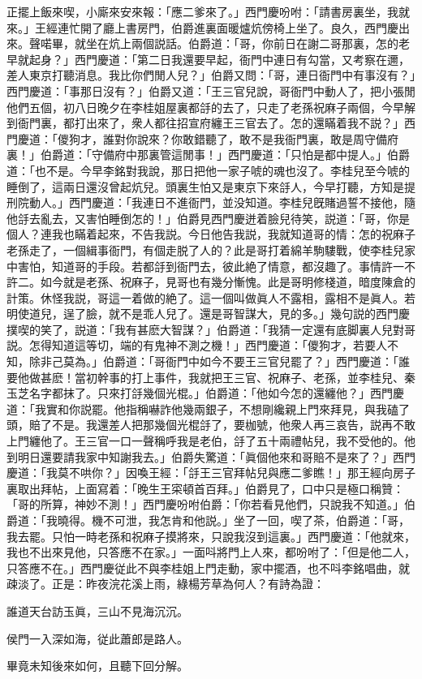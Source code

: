 正擺上飯來喫，小廝來安來報：「應二爹來了。」西門慶吩咐：「請書房裏坐，我就來。」王經連忙開了廳上書房門，伯爵進裏面暖爐炕傍椅上坐了。良久，西門慶出來。聲喏畢，就坐在炕上兩個説話。伯爵道：「哥，你前日在謝二哥那裏，怎的老早就起身？」西門慶道：「第二日我還要早起，衙門中連日有勾當，又考察在邇，差人東京打聽消息。我比你們閒人兒？」伯爵又問：「哥，連日衙門中有事沒有？」西門慶道：「事那日沒有？」伯爵又道：「王三官兒說，哥衙門中動人了，把小張閒他們五個，初八日晚夕在李桂姐屋裏都㧱的去了，只走了老孫祝麻子兩個，今早解到衙門裏，都打出來了，衆人都往招宣府纏王三官去了。怎的還瞞着我不説？」西門慶道：「儍狗才，誰對你說來？你敢錯聽了，敢不是我衙門裏，敢是周守備府裏！」伯爵道：「守備府中那裏管這閒事！」西門慶道：「只怕是都中提人。」伯爵道：「也不是。今早李銘對我說，那日把他一家子唬的魂也沒了。李桂兒至今唬的睡倒了，這兩日還沒曾起炕兒。頭裏生怕又是東京下來㧱人，今早打聽，方知是提刑院動人。」西門慶道：「我連日不進衙門，並没知道。李桂兒旣賭過誓不接他，隨他㧱去亂去，又害怕睡倒怎的！」伯爵見西門慶迸着臉兒待笑，説道：「哥，你是個人？連我也瞞着起來，不告我説。今日他告我説，我就知道哥的情：怎的祝麻子老孫走了，一個緝事衙門，有個走脱了人的？此是哥打着綿羊駒䮫戰，使李桂兒家中害怕，知道哥的手段。若都㧱到衙門去，彼此絶了情意，都沒趣了。事情許一不許二。如今就是老孫、祝麻子，見哥也有幾分慚愧。此是哥明修棧道，暗度陳倉的計策。休怪我説，哥這一着做的絶了。這一個叫做眞人不露相，露相不是眞人。若明使道兒，逞了臉，就不是乖人兒了。還是哥智謀大，見的多。」幾句説的西門慶撲喫的笑了，説道：「我有甚麽大智謀？」伯爵道：「我猜一定還有底脚裏人兒對哥説。怎得知道這等切，端的有鬼神不測之機！」西門慶道：「儍狗才，若要人不知，除非己莫為。」伯爵道：「哥衙門中如今不要王三官兒罷了？」西門慶道：「誰要他做甚麽！當初幹事的打上事件，我就把王三官、祝麻子、老孫，並李桂兒、秦玉芝名字都抹了。只來打㧱幾個光棍。」伯爵道：「他如今怎的還纏他？」西門慶道：「我實和你説罷。他指稱嚇詐他幾兩銀子，不想剛纔親上門來拜見，與我磕了頭，賠了不是。我還差人把那幾個光棍㧱了，要枷號，他衆人再三哀告，説再不敢上門纏他了。王三官一口一聲稱呼我是老伯，㧱了五十兩禮帖兒，我不受他的。他到明日還要請我家中知謝我去。」伯爵失驚道：「眞個他來和哥賠不是來了？」西門慶道：「我莫不哄你？」因喚王經：「㧱王三官拜帖兒與應二爹瞧！」那王經向房子裏取出拜帖，上面寫着：「晚生王寀頓首百拜。」伯爵見了，口中只是極口稱贊：「哥的所算，神妙不測！」西門慶吩咐伯爵：「你若看見他們，只說我不知道。」伯爵道：「我曉得。機不可泄，我怎肯和他説。」坐了一回，喫了茶，伯爵道：「哥，我去罷。只怕一時老孫和祝麻子摸將來，只說我沒到這裏。」西門慶道：「他就來，我也不出來見他，只答應不在家。」一面呌將門上人來，都吩咐了：「但是他二人，只答應不在。」西門慶従此不與李桂姐上門走動，家中擺酒，也不呌李銘唱曲，就疎淡了。正是：昨夜浣花溪上雨，綠楊芳草為何人？有詩為證：

\begin{myquote}
誰道天台訪玉眞，三山不見海沉沉。

侯門一入深如海，従此蕭郎是路人。
\end{myquote}

畢竟未知後來如何，且聽下回分解。

